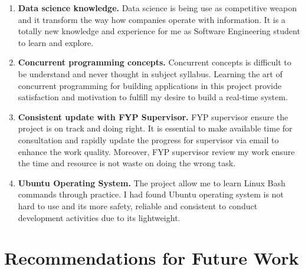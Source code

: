 \begin{enumerate}[topsep=0pt,itemsep=-1ex,partopsep=1ex,parsep=1.5ex]
	\item \textbf{Data science knowledge.} Data science is being use as competitive weapon and it transform the way how companies operate with information. It is a totally new knowledge and experience for me as Software Engineering student to learn and explore.
	
	\item \textbf{Concurrent programming concepts.} Concurrent concepts is difficult to be understand and never thought in subject syllabus. Learning the art of concurrent programming for building applications in this project provide satisfaction and motivation to fulfill my desire to build a real-time system. 
	
	\item \textbf{Consistent update with FYP Supervisor.} FYP supervisor ensure the project is on track and doing right. It is essential to make available time for consultation and rapidly update the progress for supervisor via email to enhance the work quality. Moreover, FYP supervisor review my work ensure the time and resource is not waste on doing the wrong task. 	 
	
	\item \textbf{Ubuntu Operating System.} The project allow me to learn Linux Bash commands through practice. I had found Ubuntu operating system is not hard to use and its more safety, reliable and consistent to conduct development activities due to its lightweight.
	
\end{enumerate}

\section{Recommendations for Future Work}

